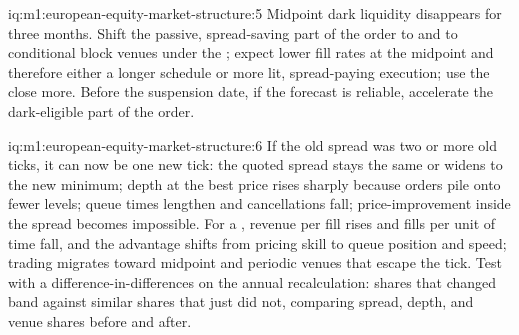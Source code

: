 \begin{solution}{iq:m1:european-equity-market-structure:5}
Midpoint dark liquidity disappears for three months. Shift the passive,
spread-saving part of the order to  and to conditional block
venues under the ; expect lower fill rates at the
midpoint and therefore either a longer schedule or more lit, spread-paying
execution; use the close more. Before the suspension date, if the forecast is
reliable, accelerate the dark-eligible part of the order.
\end{solution}

\begin{solution}{iq:m1:european-equity-market-structure:6}
If the old spread was two or more old ticks, it can now be one new tick: the
quoted spread stays the same or widens to the new minimum; depth at the best
price rises sharply because orders pile onto fewer levels; queue times
lengthen and cancellations fall; price-improvement inside the spread becomes
impossible. For a , revenue per fill rises and fills per unit of
time fall, and the advantage shifts from pricing skill to queue position and
speed; trading migrates toward midpoint and periodic venues that escape the
tick. Test with a difference-in-differences on the annual recalculation:
shares that changed band against similar shares that just did not, comparing
spread, depth,  and venue shares before and after.
\end{solution}
